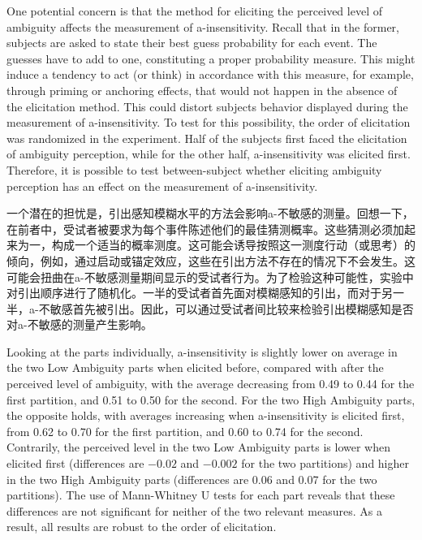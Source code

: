 \documentclass[12pt,a4paper]{article}
\newenvironment{original}
  {\par\medskip\noindent\color{black}\ignorespaces}
  {\par\medskip}
\newenvironment{translation}
  {\par\noindent\color{transblue}\ignorespaces}
  {\par\medskip\medskip}
\begin{document}
\begin{original}
One potential concern is that the method for eliciting the perceived level of ambiguity affects the measurement of a-insensitivity. Recall that in the former, subjects are asked to state their best guess probability for each event. The guesses have to add to one, constituting a proper probability measure. This might induce a tendency to act (or think) in accordance with this measure, for example, through priming or anchoring effects, that would not happen in the absence of the elicitation method. This could distort subjects behavior displayed during the measurement of a-insensitivity. To test for this possibility, the order of elicitation was randomized in the experiment. Half of the subjects first faced the elicitation of ambiguity perception, while for the other half, a-insensitivity was elicited first. Therefore, it is possible to test between-subject whether eliciting ambiguity perception has an effect on the measurement of a-insensitivity.
\end{original}

\begin{translation}
一个潜在的担忧是，引出感知模糊水平的方法会影响a-不敏感的测量。回想一下，在前者中，受试者被要求为每个事件陈述他们的最佳猜测概率。这些猜测必须加起来为一，构成一个适当的概率测度。这可能会诱导按照这一测度行动（或思考）的倾向，例如，通过启动或锚定效应，这些在引出方法不存在的情况下不会发生。这可能会扭曲在a-不敏感测量期间显示的受试者行为。为了检验这种可能性，实验中对引出顺序进行了随机化。一半的受试者首先面对模糊感知的引出，而对于另一半，a-不敏感首先被引出。因此，可以通过受试者间比较来检验引出模糊感知是否对a-不敏感的测量产生影响。
\end{translation}

\begin{original}
Looking at the parts individually, a-insensitivity is slightly lower on average in the two Low Ambiguity parts when elicited before, compared with after the perceived level of ambiguity, with the average decreasing from 0.49 to 0.44 for the first partition, and 0.51 to 0.50 for the second. For the two High Ambiguity parts, the opposite holds, with averages increasing when a-insensitivity is elicited first, from 0.62 to 0.70 for the first partition, and 0.60 to 0.74 for the second. Contrarily, the perceived level in the two Low Ambiguity parts is lower when elicited first (differences are $-0.02$ and $-0.002$ for the two partitions) and higher in the two High Ambiguity parts (differences are 0.06 and 0.07 for the two partitions). The use of Mann-Whitney U tests for each part reveals that these differences are not significant for neither of the two relevant measures. As a result, all results are robust to the order of elicitation.
\end{original}
\end{document}

